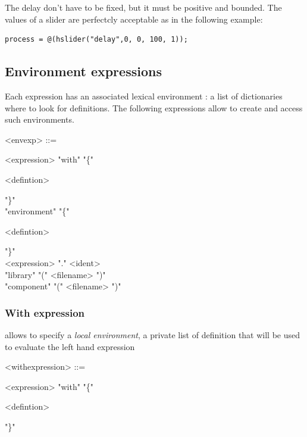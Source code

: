 \documentclass[a4paper]{book}
\begin{document}
The delay don't have to be fixed, but it must be positive and bounded. The values of a slider are perfectcly acceptable as in the following example:

\begin{lstlisting}
process = @(hslider("delay",0, 0, 100, 1));
\end{lstlisting}

\subsection{Environment expressions}
Each \faust expression has an associated lexical environment : a list of dictionaries where to look for definitions. The following expressions allow to create and access such environments.

\begin{grammar}
  <envexp> ::= 
  \begin{syntdiag}
    \begin{stack}
      <expression> "with" "\{"
        \begin{rep}
          <defintion>
        \end{rep}
        "\}" \\ 
      "environment" "\{"
        \begin{rep}
          <defintion>
        \end{rep}
        "\}" \\ 
      <expression> "." <ident> \\
      "library" "(" <filename> ")" \\
      "component" "(" <filename> ")"
    \end{stack}
  \end{syntdiag}
\end{grammar}

\subsubsection{With expression}allows to specify a \textit{local environment}, a private list of definition that will be used to evaluate the left hand expression

\begin{grammar}
  <withexpression> ::= 
  \begin{syntdiag}
      <expression> "with" "\{"
        \begin{rep}
          <defintion>
        \end{rep}
        "\}"
  \end{syntdiag}
\end{grammar}
\end{document}
